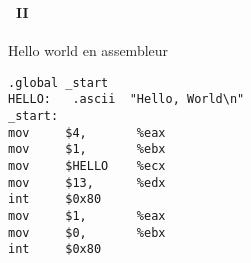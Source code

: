 \begin{frame}[containsverbatim]
  \frametitle{\secname}
  \framesubtitle{\subsecname~II}
   \begin{exampleblock}{Hello world en assembleur}
     \begin{verbatim}
.global _start
HELLO:   .ascii  "Hello, World\n"
_start:    
mov     $4,       %eax
mov     $1,       %ebx
mov     $HELLO    %ecx
mov     $13,      %edx
int     $0x80
mov     $1,       %eax
mov     $0,       %ebx
int     $0x80
     \end{verbatim}
   \end{exampleblock}
\end{frame}
